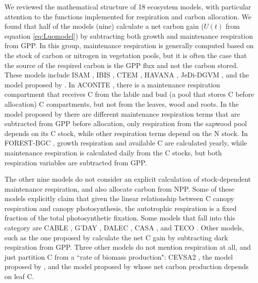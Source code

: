 \documentclass[12pt, a4paper]{article}
\begin{document}
We reviewed the mathematical structure of 18 ecosystem models, with particular attention to the functions implemented for respiration and carbon allocation. We found that half of the models (nine) calculate a net carbon gain ($U(t)$ from equation \ref{eq:Luomodel}) by subtracting both growth and maintenance respiration from GPP. In this group, maintenance respiration is generally computed based on the stock of carbon or nitrogen in vegetation pools, but it is often the case that the source of the respired carbon is the GPP flux and not the carbon stored.
These models include ISAM \citep{ElMasri2013AgricForMeteorol}, IBIS \citep{Foley1996GBC}, CTEM \citep{Arora2005GCB}, HAVANA \citep{Haverd2016Biogeosciences}, JeDi-DGVM \citep{Pavlick2013Biogeosciences}, and  the model proposed by \citet{Trugman2018EcologyLetters}. 
In ACONITE \citep{Thomas2014GeosciModelDev}, there is a maintenance respiration compartment that receives C from the labile and bud (a pool that stores C before allocation) C compartments, but not from the leaves, wood and roots. In the model proposed by \citet{Murty2000EcolModel} there are different maintenance respiration terms that are subtracted from GPP before allocation, only respiration from the sapwood pool depends on its C stock, while other respiration terms depend on the N stock. In FOREST-BGC \citep{Running1988EcolModel}, growth respiration and available C are calculated yearly, while maintenance respiration is calculated daily from the C stocks, but both respiration variables are subtracted from GPP. 

The other nine models do not consider an explicit calculation of stock-dependent maintenance respiration, and also allocate carbon from NPP. Some of these models explicitly claim that given the linear relationship between C canopy respiration and canopy photosynthesis, the autotrophic respiration is a fixed fraction of the total photosynthetic fixation. Some models that fall into this category are 
CABLE \citep{Wang2010Biogeosciences}, G'DAY \citep{Comins1993EA}, DALEC \citep{Williams2005GCB}, CASA \citep{Potter1993GlobalBiogeochemCy}, and TECO \citep{Luo2012TE}. Other models, such as the one proposed by \citet{Hilbert1991AnnBot} calculate the net C gain by subtracting dark respiration from GPP. Three other models do not mention respiration at all, and just partition C from a ``rate of biomass production": CEVSA2 \citep{Gu2010EcologicalComplexity}, the model proposed by \citet{King1993TreePhysiol}, and the model proposed by \citet{DeAngelis2012TheorEcol} whose net carbon production depends on leaf C. 
\end{document}
